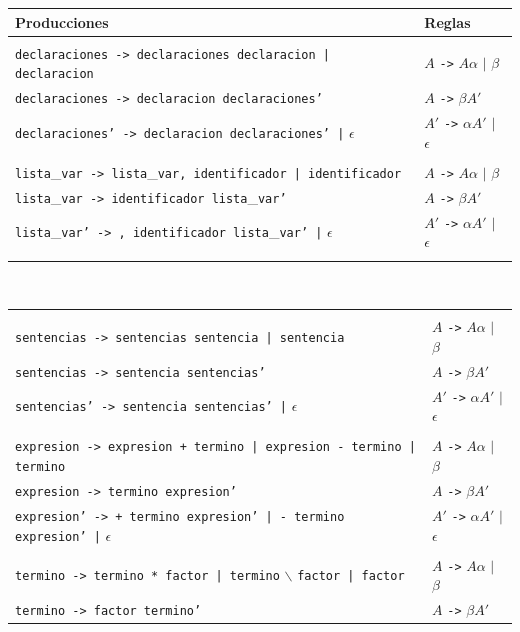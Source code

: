 \documentclass[11pt]{report}
\begin{document}
\begin{enumerate}
    \begin{tabular}{ |p{13cm}|l| }
  \hline
  \textbf{Producciones} & \textbf{Reglas} \\
  \hline
  & \\
  \texttt{declaraciones -> declaraciones declaracion | declaracion} & $A$ \texttt{->} $A \alpha$ $|$ $\beta$ \\
  \texttt{declaraciones -> declaracion declaraciones'} & $A$ \texttt{->} $\beta A'$ \\
  \texttt{declaraciones' -> declaracion declaraciones' |} $\epsilon$  & $A'$ \texttt{->} $\alpha A'$ $|$ $\epsilon$ \\
  & \\
  \texttt{lista}\_\texttt{var -> lista}\_\texttt{var, identificador | identificador} & $A$ \texttt{->} $A \alpha$ $|$ $\beta$ \\
  \texttt{lista}\_\texttt{var -> identificador lista}\_\texttt{var'} & $A$ \texttt{->} $\beta A'$ \\
  \texttt{lista}\_\texttt{var' -> , identificador lista}\_\texttt{var' |} $\epsilon$ & $A'$ \texttt{->} $\alpha A'$ $|$ $\epsilon$ \\
  & \\
\end{tabular} \\
    \begin{tabular}{ |p{13cm}|l| }
  & \\
  \texttt{sentencias -> sentencias sentencia | sentencia} & $A$ \texttt{->} $A \alpha$ $|$ $\beta$ \\
  \texttt{sentencias -> sentencia sentencias'} & $A$ \texttt{->} $\beta A'$ \\
  \texttt{sentencias' -> sentencia sentencias' |} $\epsilon$ & $A'$ \texttt{->} $\alpha A'$ $|$ $\epsilon$ \\
  & \\
  \texttt{expresion -> expresion + termino | expresion - termino | termino} & $A$ \texttt{->} $A \alpha$ $|$ $\beta$ \\
  \texttt{expresion -> termino expresion'}  & $A$ \texttt{->} $\beta A'$ \\
  \texttt{expresion' -> + termino expresion' | - termino expresion' |} $\epsilon$ & $A'$ \texttt{->} $\alpha A'$ $|$ $\epsilon$ \\
  & \\
  \texttt{termino -> termino * factor | termino} $\backslash$ \texttt{factor | factor} & $A$ \texttt{->} $A \alpha$ $|$ $\beta$ \\
  \texttt{termino -> factor termino'} & $A$ \texttt{->} $\beta A'$ \\

\end{tabular}
\end{enumerate}
\end{document}
